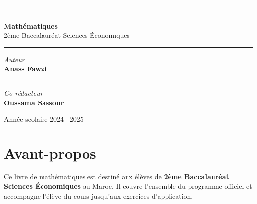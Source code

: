 \documentclass[12pt, a4paper]{book}
\begin{document}
\begin{titlepage}
  \centering
  \vspace*{2cm}

  {\color{navy!30}\rule{\linewidth}{1.5pt}}\\[1.2cm]

  {\Huge\bfseries\color{navy} Math\'{e}matiques}\\[0.6cm]

  {\large\color{charcoal}
    2\`{e}me Baccalaur\'{e}at \textemdash{} Sciences \'{E}conomiques}\\[1.2cm]

  {\color{navy!30}\rule{\linewidth}{1.5pt}}

  \vfill

  \begin{center}
    {\large\color{charcoal!60}\textit{Auteur}}\\[0.3cm]
    {\LARGE\bfseries\color{navy} Anass Fawzi}
  \end{center}

  \vspace{1.5cm}

  {\color{navy!15}\rule{6cm}{0.5pt}}

  \vspace{0.8cm}

  \begin{center}
    {\small\color{charcoal!60}\textit{Co-r\'{e}dacteur}}\\[0.3cm]
    {\large\bfseries\color{charcoal} Oussama Sassour}
  \end{center}

  \vspace{1.5cm}

  {\small\color{charcoal!50} Ann\'{e}e scolaire 2024\,--\,2025}

  \vspace{1cm}
\end{titlepage}

\chapter*{Avant-propos}

Ce livre de math\'{e}matiques est destin\'{e} aux \'{e}l\`{e}ves de
\textbf{2\`{e}me Baccalaur\'{e}at Sciences \'{E}conomiques} au Maroc.
Il couvre l'ensemble du programme officiel et accompagne l'\'{e}l\`{e}ve
du cours jusqu'aux exercices d'application.
\end{document}
